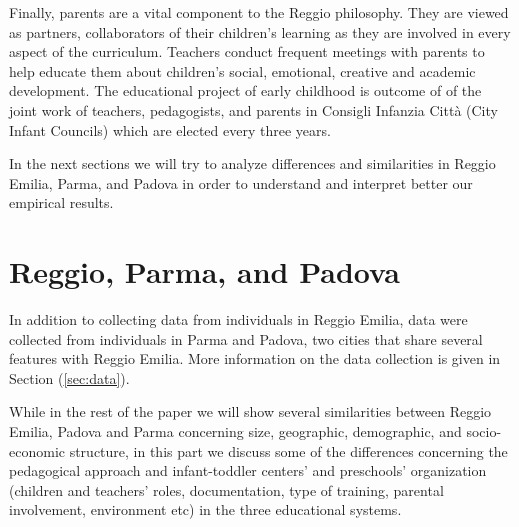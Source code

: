 \documentclass[12pt]{article}
\begin{document}
Finally, parents are a vital component to the Reggio philosophy. They are viewed as partners, collaborators of their children's learning as they are involved in every aspect of the curriculum. Teachers conduct frequent meetings with parents to help educate them about children's social, emotional, creative and academic development. The educational project of early childhood is outcome of of the joint work of teachers, pedagogists, and parents in Consigli Infanzia Citt\`{a} (City Infant Councils) which are elected every three years.

In the next sections we will try to analyze differences and similarities in Reggio Emilia, Parma, and Padova in order to understand and interpret better our empirical results.

\section{Reggio, Parma, and Padova} \label{sec:ParmaPadova}

In addition to collecting data from individuals in Reggio Emilia, data were collected from individuals in Parma and Padova, two cities that share several features with Reggio Emilia. %
More information on the data collection is given in Section (\ref{sec:data}).

While in the rest of the paper we will show several similarities between Reggio Emilia, Padova and Parma concerning size, geographic, demographic, and socio-economic structure, in this part we discuss some of the differences concerning the pedagogical approach and infant-toddler centers' and preschools' organization (children and teachers' roles, documentation, type of training, parental involvement, environment etc) in the three educational systems.

\end{document}
